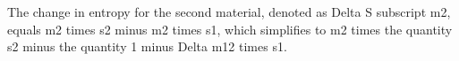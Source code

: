 The change in entropy for the second material, denoted as Delta S subscript m2, equals m2 times s2 minus m2 times s1, which simplifies to m2 times the quantity s2 minus the quantity 1 minus Delta m12 times s1.